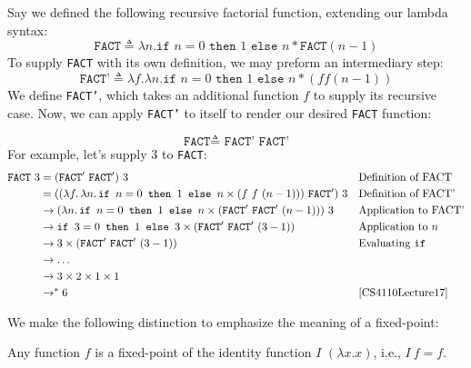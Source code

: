 \begin{Example}

    \label{ex:recursion}
    Say we defined the following recursive factorial function, extending our lambda syntax:
    \Large
    \[
        \texttt{FACT} \triangleq \lambda n. \texttt{if } n = 0 \texttt{ then } 1 \texttt{ else } n * \texttt{FACT}(n - 1)
    \]
    \normalsize
    \noindent
    To supply \texttt{FACT} with its own definition, we may preform an intermediary step:
    \Large
    \[
        \texttt{FACT'} \triangleq \lambda f. \lambda n. \texttt{if } n = 0 \texttt{ then } 1 \texttt{ else } n * (f f(n - 1))
    \]
    \normalsize
    We define \texttt{FACT'}, which takes an additional function $f$ to supply its recursive case. Now, we can apply \texttt{FACT'} to itself to render 
    our desired \texttt{FACT} function: 
    
    \vspace{-1em}
    \Large
    \[
        \texttt{FACT} \triangleq \texttt{ FACT' FACT'}
    \]
    \normalsize
    \noindent
    For example, let's supply 3 to \texttt{FACT}:
    \begin{align*}
        \texttt{FACT}\ 3 
        &= (\texttt{FACT}'\ \texttt{FACT}')\ 3 && \text{Definition of FACT} \\
        &= ((\lambda f.\, \lambda n.\, \texttt{if } n = 0 \texttt{ then } 1 \texttt{ else } n \times (f\ f\ (n - 1)))\ \texttt{FACT}')\ 3 && \text{Definition of FACT'} \\
        &\to (\lambda n.\, \texttt{if } n = 0 \texttt{ then } 1 \texttt{ else } n \times (\texttt{FACT}'\ \texttt{FACT}'\ (n - 1)))\ 3 && \text{Application to FACT'} \\
        &\to \texttt{if } 3 = 0 \texttt{ then } 1 \texttt{ else } 3 \times (\texttt{FACT}'\ \texttt{FACT}'\ (3 - 1)) && \text{Application to } n \\
        &\to 3 \times (\texttt{FACT}'\ \texttt{FACT}'\ (3 - 1)) && \text{Evaluating \texttt{if}} \\
        &\to \ldots \\
        &\to 3 \times 2 \times 1 \times 1 \\
        &\to^* 6 && \cite{CS4110Lecture17}
        \end{align*}
        

\end{Example}

\newpage 

\noindent
We make the following distinction to emphasize the meaning of a fixed-point:
\begin{theo}

    Any function $f$ is a fixed-point of the identity function $I$ $(\lambda x.x)$, i.e., $I\ f = f$.
\end{theo}

